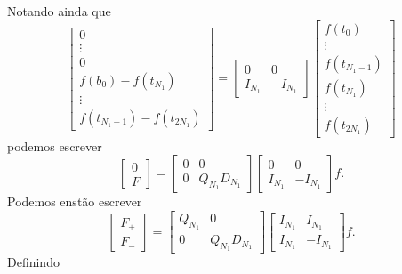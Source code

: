 Notando ainda que
\begin{dmath*}
  \begin{bmatrix}
    0 \\
    \vdots \\
    0 \\
    f(b_0) - f(t_{N_1}) \\
    \vdots \\
    f(t_{N_1 - 1}) - f(t_{2 N_1})
    \end{bmatrix} = \begin{bmatrix}
    0 & 0 \\
    I_{N_1} & -I_{N_1}
    \end{bmatrix} \begin{bmatrix}
    f(t_0) \\
    \vdots \\
    f(t_{N_1 - 1}) \\
    f(t_{N_1}) \\
    \vdots \\
    f(t_{2 N_1})
  \end{bmatrix}
\end{dmath*}
podemos escrever
\begin{dmath*}
  \begin{bmatrix}
    0 \\
    F
  \end{bmatrix} = \begin{bmatrix}
    0 & 0 \\
    0 & Q_{N_1} D_{N_1}
  \end{bmatrix} \begin{bmatrix}
    0 & 0 \\
    I_{N_1} & -I_{N_1}
  \end{bmatrix} f.
\end{dmath*}
Podemos enstão escrever
\begin{dmath*}
  \begin{bmatrix}
    F_{+} \\
    F_{-}
    \end{bmatrix} = \begin{bmatrix}
    Q_{N_1} & 0 \\
    0 & Q_{N_1} D_{N_1}
    \end{bmatrix} \begin{bmatrix}
    I_{N_1} & I_{N_1} \\
    I_{N_1} & -I_{N_1}
  \end{bmatrix} f.
\end{dmath*}
Definindo
